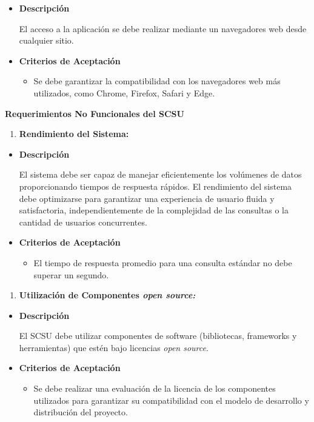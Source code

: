 \documentclass[
  12pt,
  openany]{book}
\providecommand{\tightlist}{%
  \setlength{\itemsep}{0pt}\setlength{\parskip}{0pt}}
\begin{document}
\begin{itemize}
\item
  \textbf{Descripción}

  El acceso a la aplicación se debe realizar mediante un navegadores web desde cualquier sitio.
\item
  \textbf{Criterios de Aceptación}

  \begin{itemize}
  \tightlist
  \item
    Se debe garantizar la compatibilidad con los navegadores web más utilizados, como Chrome, Firefox, Safari y Edge.
  \end{itemize}
\end{itemize}

\textbf{Requerimientos No Funcionales del SCSU}

\begin{enumerate}
\def\labelenumi{\arabic{enumi}.}
\tightlist
\item
  \textbf{Rendimiento del Sistema:}
\end{enumerate}

\begin{itemize}
\item
  \textbf{Descripción}

  El sistema debe ser capaz de manejar eficientemente los volúmenes de datos proporcionando tiempos de respuesta rápidos. El rendimiento del sistema debe optimizarse para garantizar una experiencia de usuario fluida y satisfactoria, independientemente de la complejidad de las consultas o la cantidad de usuarios concurrentes.
\item
  \textbf{Criterios de Aceptación}

  \begin{itemize}
  \tightlist
  \item
    El tiempo de respuesta promedio para una consulta estándar no debe superar un segundo.
  \end{itemize}
\end{itemize}

\begin{enumerate}
\def\labelenumi{\arabic{enumi}.}
\setcounter{enumi}{1}
\tightlist
\item
  \textbf{Utilización de Componentes \emph{open source:}}
\end{enumerate}

\begin{itemize}
\item
  \textbf{Descripción}

  El SCSU debe utilizar componentes de software (bibliotecas, frameworks y herramientas) que estén bajo licencias \emph{open source}.
\item
  \textbf{Criterios de Aceptación}

  \begin{itemize}
  \tightlist
  \item
    Se debe realizar una evaluación de la licencia de los componentes utilizados para garantizar su compatibilidad con el modelo de desarrollo y distribución del proyecto.
  \end{itemize}
\end{itemize}
\end{document}
